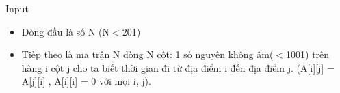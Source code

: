 Input
\begin{itemize}
	\item Dòng đầu là số N (N$<$201)
	\item Tiếp theo là ma trận N dòng N cột: 1 số nguyên không âm($<$1001) trên hàng i cột j cho ta biết thời gian đi từ địa điểm i đến địa điểm j. (A[i][j] = A[j][i] , A[i][i] = 0 với mọi i, j).
\end{itemize}